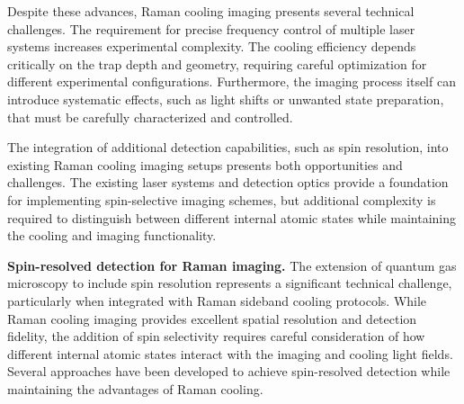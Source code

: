 Despite these advances, Raman cooling imaging presents several technical challenges. The requirement for precise frequency control of multiple laser systems increases experimental complexity. The cooling efficiency depends critically on the trap depth and geometry, requiring careful optimization for different experimental configurations. Furthermore, the imaging process itself can introduce systematic effects, such as light shifts or unwanted state preparation, that must be carefully characterized and controlled.

The integration of additional detection capabilities, such as spin resolution, into existing Raman cooling imaging setups presents both opportunities and challenges. The existing laser systems and detection optics provide a foundation for implementing spin-selective imaging schemes, but additional complexity is required to distinguish between different internal atomic states while maintaining the cooling and imaging functionality.



\textbf{Spin-resolved detection for Raman imaging.}
The extension of quantum gas microscopy to include spin resolution represents a significant technical challenge, particularly when integrated with Raman sideband cooling protocols. While Raman cooling imaging provides excellent spatial resolution and detection fidelity, the addition of spin selectivity requires careful consideration of how different internal atomic states interact with the imaging and cooling light fields. Several approaches have been developed to achieve spin-resolved detection while maintaining the advantages of Raman cooling.

